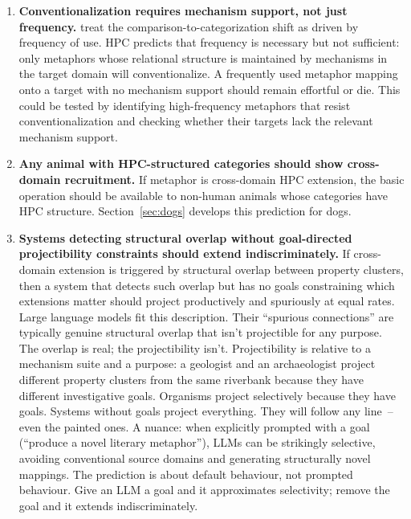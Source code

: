 \documentclass[12pt]{article}
\begin{document}
\begin{enumerate}
\item \textbf{Conventionalization requires mechanism support, not just frequency.} \textcite{bowdle2005} treat the comparison-to-categorization shift as driven by frequency of use. HPC predicts that frequency is necessary but not sufficient: only metaphors whose relational structure is maintained by mechanisms in the target domain will conventionalize. A frequently used metaphor mapping onto a target with no mechanism support should remain effortful or die. This could be tested by identifying high-frequency metaphors that resist conventionalization and checking whether their targets lack the relevant mechanism support.

\item \textbf{Any animal with HPC-structured categories should show cross-domain recruitment.} If metaphor is cross-domain HPC extension, the basic operation should be available to non-human animals whose categories have HPC structure. Section~\ref{sec:dogs} develops this prediction for dogs.

\item \textbf{Systems detecting structural overlap without goal-directed projectibility constraints should extend indiscriminately.} If cross-domain extension is triggered by structural overlap between property clusters, then a system that detects such overlap but has no goals constraining which extensions matter should project productively and spuriously at equal rates. Large language models fit this description. Their \enquote{spurious connections} are typically genuine structural overlap that isn't projectible for any purpose. The overlap is real; the projectibility isn't. Projectibility is relative to a mechanism suite and a purpose: a geologist and an archaeologist project different property clusters from the same riverbank because they have different investigative goals. Organisms project selectively because they have goals. Systems without goals project everything. They will follow any line~-- even the painted ones. A nuance: when explicitly prompted with a goal (\enquote{produce a novel literary metaphor}), LLMs can be strikingly selective, avoiding conventional source domains and generating structurally novel mappings. The prediction is about default behaviour, not prompted behaviour. Give an LLM a goal and it approximates selectivity; remove the goal and it extends indiscriminately.
\end{enumerate}
\end{document}
